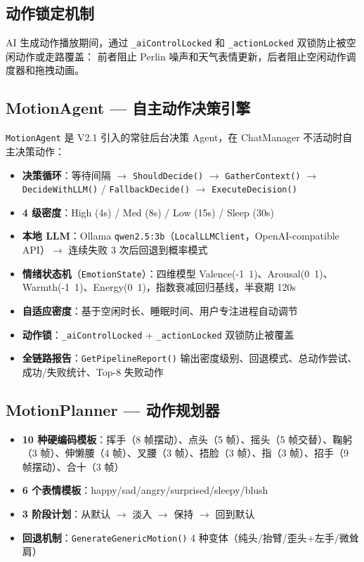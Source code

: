 \documentclass[12pt,a4paper]{ctexart}
\begin{document}
\subsection{动作锁定机制}

AI 生成动作播放期间，通过 \texttt{\_aiControlLocked} 和 \texttt{\_actionLocked} 双锁防止被空闲动作或走路覆盖：
前者阻止 Perlin 噪声和天气表情更新，后者阻止空闲动作调度器和拖拽动画。

\subsection{MotionAgent --- 自主动作决策引擎}

\texttt{MotionAgent} 是 V2.1 引入的常驻后台决策 Agent，在 ChatManager 不活动时自主决策动作：

\begin{itemize}
    \item \textbf{决策循环}：等待间隔 $\rightarrow$ \texttt{ShouldDecide()} $\rightarrow$ \texttt{GatherContext()} $\rightarrow$ \texttt{DecideWithLLM()} / \texttt{FallbackDecide()} $\rightarrow$ \texttt{ExecuteDecision()}
    \item \textbf{4 级密度}：High (4s) / Med (8s) / Low (15s) / Sleep (30s)
    \item \textbf{本地 LLM}：Ollama \texttt{qwen2.5:3b}（\texttt{LocalLLMClient}，OpenAI-compatible API）$\rightarrow$ 连续失败 3 次后回退到概率模式
    \item \textbf{情绪状态机}（\texttt{EmotionState}）：四维模型 Valence(-1~1)、Arousal(0~1)、Warmth(-1~1)、Energy(0~1)，指数衰减回归基线，半衰期 120s
    \item \textbf{自适应密度}：基于空闲时长、睡眠时间、用户专注进程自动调节
    \item \textbf{动作锁}：\texttt{\_aiControlLocked} + \texttt{\_actionLocked} 双锁防止被覆盖
    \item \textbf{全链路报告}：\texttt{GetPipelineReport()} 输出密度级别、回退模式、总动作尝试、成功/失败统计、Top-8 失败动作
\end{itemize}

\subsection{MotionPlanner --- 动作规划器}

\begin{itemize}
    \item \textbf{10 种硬编码模板}：挥手（8 帧摆动）、点头（5 帧）、摇头（5 帧交替）、鞠躬（3 帧）、伸懒腰（4 帧）、叉腰（3 帧）、捂脸（3 帧）、指（3 帧）、招手（9 帧摆动）、合十（3 帧）
    \item \textbf{6 个表情模板}：happy/sad/angry/surprised/sleepy/blush
    \item \textbf{3 阶段计划}：从默认 $\rightarrow$ 淡入 $\rightarrow$ 保持 $\rightarrow$ 回到默认
    \item \textbf{回退机制}：\texttt{GenerateGenericMotion()} 4 种变体（纯头/抬臂/歪头+左手/微耸肩）
\end{itemize}
\end{document}
